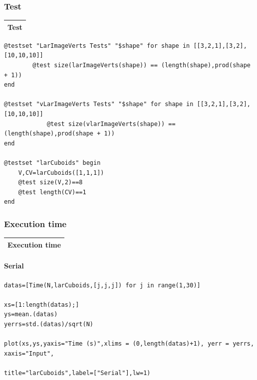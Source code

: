 \documentclass{article}
\begin{document}
\subsubsection{Test}
\begin{center}
\begin{tabular}{|p{16cm}|}
\hline
\cellcolor[gray]{.9}Test\\
\hline
\end{tabular}
\end{center}

\begin{flushleft}\small
\begin{list}{}{} \item
\begin{Verbatim}[tabsize=4]
@testset "LarImageVerts Tests" "$shape" for shape in [[3,2,1],[3,2],[10,10,10]]
		@test size(larImageVerts(shape)) == (length(shape),prod(shape + 1))
end

@testset "vLarImageVerts Tests" "$shape" for shape in [[3,2,1],[3,2],[10,10,10]]
		    @test size(vlarImageVerts(shape)) == (length(shape),prod(shape + 1))
end

@testset "larCuboids" begin
	V,CV=larCuboids([1,1,1])
	@test size(V,2)==8
	@test length(CV)==1
end

\end{Verbatim}
\end{list}
\end{flushleft}
\subsubsection{Execution time}
\begin{center}
\begin{tabular}{|p{16cm}|}
\hline
\cellcolor[gray]{.9}Execution time\\
\hline
\end{tabular}
\end{center}


\paragraph{Serial}
\begin{flushleft}\small
\begin{list}{}{} \item
    \begin{Verbatim}[tabsize=4]
datas=[Time(N,larCuboids,[j,j,j]) for j in range(1,30)]

xs=[1:length(datas);]
ys=mean.(datas)
yerrs=std.(datas)/sqrt(N)

plot(xs,ys,yaxis="Time (s)",xlims = (0,length(datas)+1), yerr = yerrs, xaxis="Input", 
                                                title="larCuboids",label=["Serial"],lw=1)
    \end{Verbatim}
\end{list}
\end{flushleft} 
\end{document}
